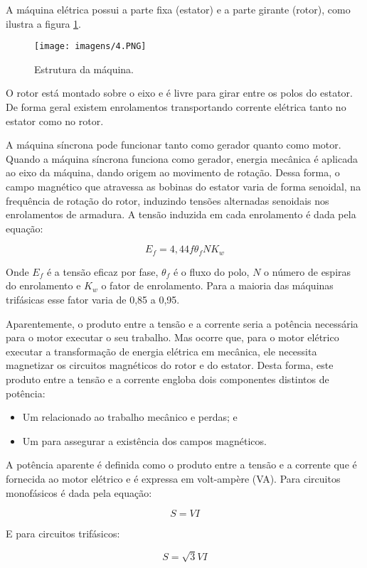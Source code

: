 A máquina elétrica possui a parte fixa (estator) e a parte girante (rotor), como ilustra a figura \ref{fig:4}.

\begin{figure}[ht!]
\center 
\texttt{[image: imagens/4.PNG]}
\caption{Estrutura da máquina.}\label{fig:4}
\end{figure}

O rotor está montado sobre o eixo e é livre para girar entre os polos do estator. De forma geral existem enrolamentos transportando corrente elétrica tanto no estator como no rotor.

A máquina síncrona pode funcionar tanto como gerador quanto como motor. Quando a
máquina síncrona funciona como gerador, energia mecânica é aplicada ao eixo da máquina, dando origem ao movimento de rotação. Dessa forma, o campo magnético que atravessa as bobinas do estator varia de forma senoidal, na frequência de rotação do rotor, induzindo tensões alternadas senoidais nos enrolamentos de armadura. A tensão induzida em cada enrolamento é dada pela equação:

$$E_f = 4,44  {f}\theta_f {N}{K_{w}}$$

Onde $E_f$ é a tensão eficaz por fase, $\theta_f$ é o fluxo do polo, $N$ o número de espiras do enrolamento e $K_w$ o fator de enrolamento. Para a maioria das máquinas trifásicas esse fator varia de 0,85 a 0,95.

Aparentemente, o produto entre a tensão e a corrente seria a potência necessária para o
motor executar o seu trabalho. Mas ocorre que, para o motor elétrico executar a transformação de energia elétrica em mecânica, ele necessita magnetizar os circuitos magnéticos do rotor e do estator. Desta forma, este produto entre a tensão e a corrente engloba dois componentes distintos de potência: 
\begin{itemize}
\item Um relacionado ao trabalho mecânico e perdas; e
\item Um para assegurar a existência dos campos magnéticos.
\end{itemize}

A potência aparente é definida como o produto entre a tensão e a corrente que é fornecida ao motor elétrico e é expressa em volt-ampère (VA). Para circuitos monofásicos é dada pela equação:

$$S = VI$$

E para circuitos trifásicos:

$$S = \sqrt{3}{VI}$$

